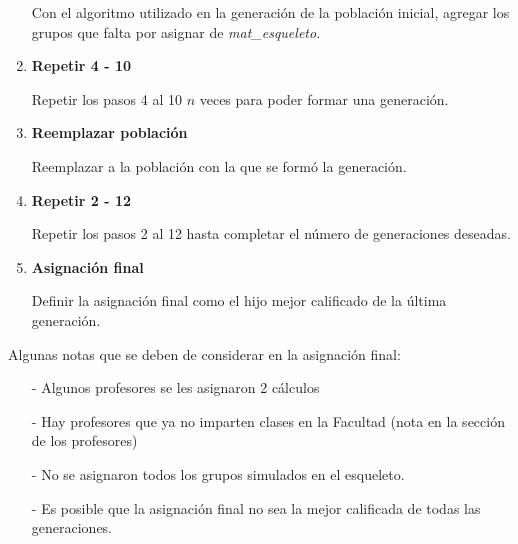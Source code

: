 \begin{enumerate}
Con el algoritmo utilizado en la generación de la población inicial, agregar los grupos que falta por asignar de \textit{mat\_esqueleto}.

\item \textbf{Repetir 4 - 10}

Repetir los pasos 4 al 10 $n$ veces para poder formar una generación.

\item \textbf{Reemplazar población}

Reemplazar a la población con la que se formó la generación.

\item \textbf{Repetir 2 - 12}

Repetir los pasos 2 al 12 hasta completar el número de generaciones deseadas.

\item \textbf{Asignación final}

Definir la asignación final como el hijo mejor calificado de la última generación.
\end{enumerate}


Algunas notas que se deben de considerar en la asignación final:

\begin{itemize}
\item[-] Algunos profesores se les asignaron 2 cálculos

\item[-] Hay profesores que ya no imparten clases en la Facultad (nota en la sección de los profesores)

\item[-] No se asignaron todos los grupos simulados en el esqueleto.

\item[-] Es posible que la asignación final no sea la mejor calificada de todas las generaciones.
\end{itemize}


